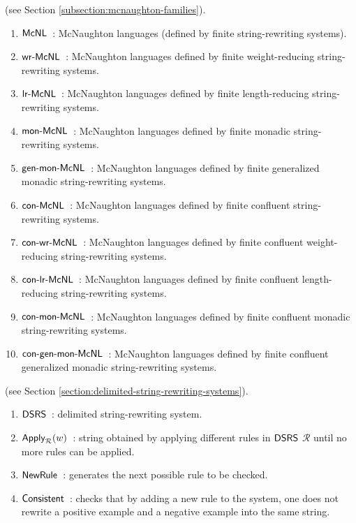  (see Section \ref{subsection:mcnaughton-families}).

\begin{enumerate}[]
\item ${\sf McNL}$\ : McNaughton languages (defined by finite string-rewriting systems).
\item $\textup{\sf wr-McNL}$\ : McNaughton languages defined by finite weight-reducing string-rewriting systems.
\item $\textup{\sf lr-McNL}$\ : McNaughton languages defined by finite length-reducing string-rewriting systems.
\item $\textup{\sf mon-McNL}$\ : McNaughton languages defined by finite monadic string-rewriting systems.
\item $\textup{\sf gen-mon-McNL}$\ : McNaughton languages defined by finite generalized monadic string-rewriting systems.
\item $\textup{\sf con-McNL}$\ : McNaughton languages defined by finite confluent string-rewriting systems.
\item $\textup{\sf con-wr-McNL}$\ : McNaughton languages defined by finite confluent weight-reducing string-rewriting systems.
\item $\textup{\sf con-lr-McNL}$\ : McNaughton languages defined by finite confluent length-reducing string-rewriting systems.
\item $\textup{\sf con-mon-McNL}$\ : McNaughton languages defined by finite confluent monadic string-rewriting systems.
\item $\textup{\sf con-gen-mon-McNL}$\ : McNaughton languages defined by finite confluent generalized monadic string-rewriting systems.
\end{enumerate}

 (see Section \ref{section:delimited-string-rewriting-systems}).

\begin{enumerate}[]
\item $\textup{\sf DSRS}$\ : delimited string-rewriting system.
\item $\textup{\sf Apply}_{\mathcal{R}}(w)$\ : string obtained by applying different rules in $\textup{\sf DSRS}$ $\mathcal{R}$ until no more rules can be applied.
\item $\textup{\sf NewRule}$\ : generates the next possible rule to be checked.
\item $\textup{\sf Consistent}$\ : checks that by adding a new rule to the system, one does not rewrite a positive example and a negative example into the same string.
\end{enumerate}

